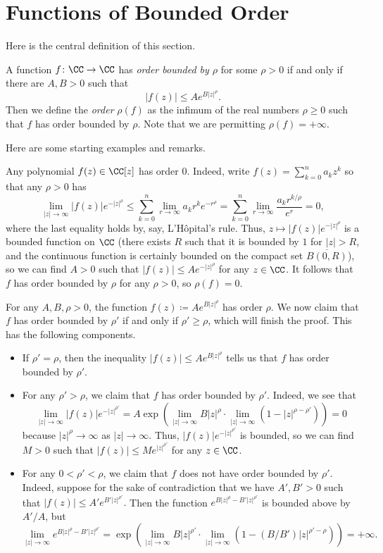 \documentclass[notes.tex]{subfiles}
\begin{document}
\section{Functions of Bounded Order}
Here is the central definition of this section.
\begin{definition}[order]
	A function $f\colon\CC\to\CC$ has \textit{order bounded by $\rho$} for some $\rho>0$ if and only if there are $A,B>0$ such that
	\[|f(z)|\le Ae^{B|z|^\rho}.\]
	Then we define the \textit{order} $\rho(f)$ as the infimum of the real numbers $\rho\ge0$ such that $f$ has order bounded by $\rho$. Note that we are permitting $\rho(f)=+\infty$.
\end{definition}
Here are some starting examples and remarks.
\begin{example} \label{ex:poly-order}
	Any polynomial $f(z)\in\CC[z]$ has order $0$. Indeed, write $f(z)=\sum_{k=0}^na_kz^k$ so that any $\rho>0$ has
	\[\lim_{|z|\to\infty}|f(z)|e^{-|z|^\rho}\le\sum_{k=0}^n\lim_{r\to\infty}a_kr^ke^{-r^\rho}=\sum_{k=0}^n\lim_{r\to\infty}\frac{a_kr^{k/\rho}}{e^r}=0,\]
	where the last equality holds by, say, L'H\^opital's rule. Thus, $z\mapsto|f(z)|e^{-|z|^\rho}$ is a bounded function on $\CC$ (there exists $R$ such that it is bounded by $1$ for $|z|>R$, and the continuous function is certainly bounded on the compact set $\overline{B(0,R)}$), so we can find $A>0$ such that $|f(z)|\le Ae^{-|z|^\rho}$ for any $z\in\CC$. It follows that $f$ has order bounded by $\rho$ for any $\rho>0$, so $\rho(f)=0$.
\end{example}
\begin{example} \label{ex:exp-orders}
	For any $A,B,\rho>0$, the function $f(z)\coloneqq Ae^{B|z|^\rho}$ has order $\rho$. We now claim that $f$ has order bounded by $\rho'$ if and only if $\rho'\ge\rho$, which will finish the proof. This has the following components.
	\begin{itemize}
		\item If $\rho'=\rho$, then the inequality $|f(z)|\le Ae^{B|z|^\rho}$ tells us that $f$ has order bounded by $\rho'$.
		\item For any $\rho'>\rho$, we claim that $f$ has order bounded by $\rho'$. Indeed, we see that
		\[\lim_{|z|\to\infty}|f(z)|e^{-|z|^{\rho'}}=A\exp\left(\lim_{|z|\to\infty}B|z|^\rho\cdot\lim_{|z|\to\infty}\left(1-|z|^{\rho-\rho'}\right)\right)=0\]
		because $|z|^\rho\to\infty$ as $|z|\to\infty$. Thus, $|f(z)|e^{-|z|^{\rho'}}$ is bounded, so we can find $M>0$ such that $|f(z)|\le Me^{|z|^{\rho'}}$ for any $z\in\CC$.
		\item For any $0<\rho'<\rho$, we claim that $f$ does not have order bounded by $\rho'$. Indeed, suppose for the sake of contradiction that we have $A',B'>0$ such that $|f(z)|\le A'e^{B'|z|^{\rho'}}.$ Then the function $e^{B|z|^\rho-B'|z|^{\rho'}}$ is bounded above by $A'/A$, but
		\[\lim_{|z|\to\infty}e^{B|z|^\rho-B'|z|^{\rho'}}=\exp\left(\lim_{|z|\to\infty}B|z|^{\rho'}\cdot\lim_{|z|\to\infty}\left(1-(B/B')|z|^{\rho'-\rho}\right)\right)=+\infty.\]
	\end{itemize}
\end{example}
\end{document}
